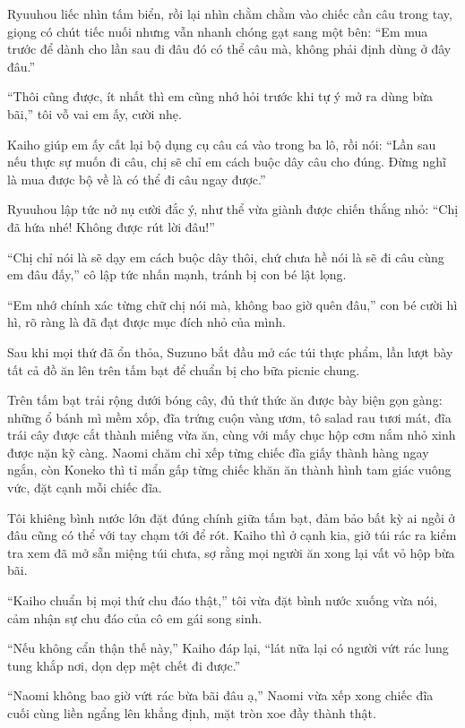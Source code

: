 ﻿\documentclass[../main.tex]{subfiles}
\begin{document}
Ryuuhou liếc nhìn tấm biển, rồi lại nhìn chằm chằm vào chiếc cần câu trong tay, giọng có chút tiếc nuối nhưng vẫn nhanh chóng gạt sang một bên: ``Em mua trước để dành cho lần sau đi đâu đó có thể câu mà, không phải định dùng ở đây đâu.''

``Thôi cũng được, ít nhất thì em cũng nhớ hỏi trước khi tự ý mở ra dùng bừa bãi,'' tôi vỗ vai em ấy, cười nhẹ.

Kaiho giúp em ấy cất lại bộ dụng cụ câu cá vào trong ba lô, rồi nói: ``Lần sau nếu thực sự muốn đi câu, chị sẽ chỉ em cách buộc dây câu cho đúng. Đừng nghĩ là mua được bộ về là có thể đi câu ngay được.''

Ryuuhou lập tức nở nụ cười đắc ý, như thể vừa giành được chiến thắng nhỏ: ``Chị đã hứa nhé! Không được rút lời đâu!''

``Chị chỉ nói là sẽ dạy em cách buộc dây thôi, chứ chưa hề nói là sẽ đi câu cùng em đâu đấy,'' cô lập tức nhấn mạnh, tránh bị con bé lật lọng.

``Em nhớ chính xác từng chữ chị nói mà, không bao giờ quên đâu,'' con bé cười hì hì, rõ ràng là đã đạt được mục đích nhỏ của mình.

Sau khi mọi thứ đã ổn thỏa, Suzuno bắt đầu mở các túi thực phẩm, lần lượt bày tất cả đồ ăn lên trên tấm bạt để chuẩn bị cho bữa picnic chung.

Trên tấm bạt trải rộng dưới bóng cây, đủ thứ thức ăn được bày biện gọn gàng: những ổ bánh mì mềm xốp, đĩa trứng cuộn vàng ươm, tô salad rau tươi mát, đĩa trái cây được cắt thành miếng vừa ăn, cùng với mấy chục hộp cơm nắm nhỏ xinh được nặn kỹ càng. Naomi chăm chỉ xếp từng chiếc đĩa giấy thành hàng ngay ngắn, còn Koneko thì tỉ mẩn gấp từng chiếc khăn ăn thành hình tam giác vuông vức, đặt cạnh mỗi chiếc đĩa.

Tôi khiêng bình nước lớn đặt đúng chính giữa tấm bạt, đảm bảo bất kỳ ai ngồi ở đâu cũng có thể với tay chạm tới để rót. Kaiho thì ở cạnh kia, giở túi rác ra kiểm tra xem đã mở sẵn miệng túi chưa, sợ rằng mọi người ăn xong lại vất vỏ hộp bừa bãi.

``Kaiho chuẩn bị mọi thứ chu đáo thật,'' tôi vừa đặt bình nước xuống vừa nói, cảm nhận sự chu đáo của cô em gái song sinh.

``Nếu không cẩn thận thế này,'' Kaiho đáp lại, ``lát nữa lại có người vứt rác lung tung khắp nơi, dọn dẹp mệt chết đi được.''

``Naomi không bao giờ vứt rác bừa bãi đâu ạ,'' Naomi vừa xếp xong chiếc đĩa cuối cùng liền ngẩng lên khẳng định, mặt tròn xoe đầy thành thật.
\end{document}

